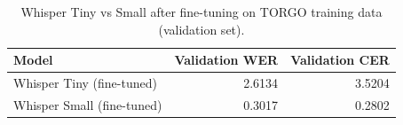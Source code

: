 \begin{table}
\caption{Whisper Tiny vs Small after fine-tuning on TORGO training data (validation set).}
\label{tab:table_2_whisper_baseline}
\begin{tabular}{lrr}
\toprule
Model & Validation WER & Validation CER \\
\midrule
Whisper Tiny (fine-tuned) & 2.6134 & 3.5204 \\
Whisper Small (fine-tuned) & 0.3017 & 0.2802 \\
\bottomrule
\end{tabular}
\end{table}
